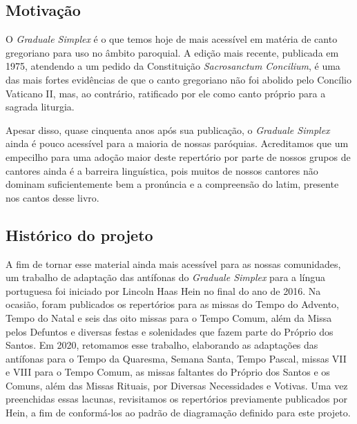 \newcommand{\GR}{\emph{Graduale Romanum}}
\newcommand{\GS}{\emph{Graduale Simplex}}
\newcommand{\KS}{\emph{Kyriale Simplex}}
\newcommand{\Al}{\emph{Allelúia}}
\newcommand{\Schola}{\emph{schola}}
\newcommand{\ScholaC}{\emph{schola cantorum}}
\newcommand{\FirstPara}[1]{\noindent\textcolor{gregoriocolor}{#1.}}
\newcommand{\Para}[1]{\vspace{\baselineskip}\noindent\textcolor{gregoriocolor}{#1.}}



\subsection{Motivação}

O {\GS} é o que temos hoje de mais acessível em matéria de canto gregoriano para uso no âmbito paroquial. A edição mais recente, publicada em 1975, atendendo a um pedido da Constituição \emph{Sacrosanctum Concilium}, é uma das mais fortes evidências de que o canto gregoriano não foi abolido pelo Concílio Vaticano II, mas, ao contrário, ratificado por ele como canto próprio para a sagrada liturgia.

Apesar disso, quase cinquenta anos após sua publicação, o {\GS} ainda é pouco acessível para a maioria de nossas paróquias. Acreditamos que um empecilho para uma adoção maior deste repertório por parte de nossos grupos de cantores ainda é a barreira linguística, pois muitos de nossos cantores não dominam suficientemente bem a pronúncia e a compreensão do latim, presente nos cantos desse livro.

\subsection{Histórico do projeto}

A fim de tornar esse material ainda mais acessível para as nossas comunidades, um trabalho de adaptação das antífonas do {\GS} para a língua portuguesa foi iniciado por Lincoln Haas Hein no final do ano de 2016. Na ocasião, foram publicados os repertórios para as missas do Tempo do Advento, Tempo do Natal e seis das oito missas para o Tempo Comum, além da Missa pelos Defuntos e diversas festas e solenidades que fazem parte do Próprio dos Santos. Em 2020, retomamos esse trabalho, elaborando as adaptações das antífonas para o Tempo da Quaresma, Semana Santa, Tempo Pascal, missas VII e VIII para o Tempo Comum, as missas faltantes do Próprio dos Santos e os Comuns, além das Missas Rituais, por Diversas Necessidades e Votivas. Uma vez preenchidas essas lacunas, revisitamos os repertórios previamente publicados por Hein, a fim de conformá-los ao padrão de diagramação definido para este projeto.

